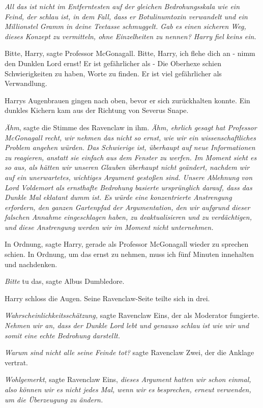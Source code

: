 \emph{All das ist nicht im Entferntesten auf der gleichen Bedrohungsskala wie
ein Feind, der schlau ist, in dem Fall, dass er Botulinumtoxin verwandelt und
ein Millionstel Gramm in deine Teetasse schmuggelt. Gab es einen sicheren Weg,
dieses Konzept zu vermitteln, ohne Einzelheiten zu nennen? Harry fiel keins
ein.}

\glqq{}Bitte, Harry\grqq{}, sagte Professor McGonagall. \glqq{}Bitte, Harry, ich
flehe dich an - nimm den Dunklen Lord ernst! Er ist gefährlicher als -\grqq{}
Die Oberhexe schien Schwierigkeiten zu haben, Worte zu finden. \glqq{}Er ist viel
gefährlicher als Verwandlung.\grqq{}

Harrys Augenbrauen gingen nach oben, bevor er sich zurückhalten konnte. Ein
dunkles Kichern kam aus der Richtung von Severus Snape.

\emph{Ähm}, sagte die Stimme des Ravenclaw in ihm. \emph{Ähm, ehrlich gesagt hat
Professor McGonagall recht, wir nehmen das nicht so ernst, wie wir ein
wissenschaftliches Problem angehen würden.} \emph{Das Schwierige ist, überhaupt
auf neue Informationen zu reagieren, anstatt sie einfach aus dem Fenster zu
werfen. Im Moment sieht es so aus, als hätten wir unseren Glauben überhaupt
nicht geändert, nachdem wir auf ein unerwartetes, wichtiges Argument gestoßen
sind. Unsere Ablehnung von Lord Voldemort als ernsthafte Bedrohung basierte
ursprünglich darauf, dass das Dunkle Mal eklatant dumm ist. Es würde eine
konzentrierte Anstrengung erfordern, den ganzen Gartenpfad der Argumentation,
den wir aufgrund dieser falschen Annahme eingeschlagen haben, zu deaktualisieren
und zu verdächtigen, und diese Anstrengung werden wir im Moment nicht
unternehmen.}

\glqq{}In Ordnung\grqq{}, sagte Harry, gerade als Professor McGonagall wieder zu
sprechen schien. \glqq{}In Ordnung, um das ernst zu nehmen, muss ich fünf Minuten
innehalten und nachdenken.\grqq{}

\glqq{}\emph{Bitte} tu das\grqq{}, sagte Albus Dumbledore.

Harry schloss die Augen. Seine Ravenclaw-Seite teilte sich in drei.

\emph{Wahrscheinlichkeitsschätzung,} sagte Ravenclaw Eins, der als Moderator
fungierte. \emph{Nehmen wir an, dass der Dunkle Lord lebt und genauso schlau ist
wie wir und somit eine echte Bedrohung darstellt.}

\emph{Warum sind nicht alle seine Feinde tot?} sagte Ravenclaw Zwei, der die
Anklage vertrat.

\emph{Wohlgemerkt}, sagte Ravenclaw Eins, \emph{dieses Argument hatten wir schon
einmal, also können wir es nicht jedes Mal, wenn wir es besprechen, erneut
verwenden, um die Überzeugung zu ändern.}

